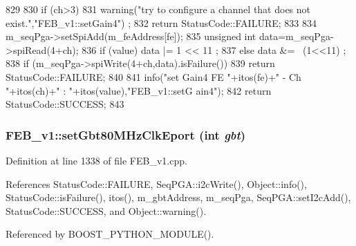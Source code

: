 \begin{DoxyCode}
829                                                        {
830   if (ch>3){
831     warning("try to configure a channel that does not exist.","FEB_v1::setGain4")
      ;
832     return StatusCode::FAILURE;
833   }
834   m_seqPga->setSpiAdd(m_feAddress[fe]);
835   unsigned int data=m_seqPga->spiRead(4+ch);
836   if (value)  data |= 1 << 11 ;
837   else        data &= ~(1<<11) ;
838   if (m_seqPga->spiWrite(4+ch,data).isFailure()){
839     return StatusCode::FAILURE;
840   }
841   info("set Gain4 FE "+itos(fe)+" - Ch "+itos(ch)+" : "+itos(value),"FEB_v1::setG
      ain4");
842   return StatusCode::SUCCESS;
843 }
\end{DoxyCode}
\hypertarget{classFEB__v1_a6efa59ad9f80ae40aad2df0b925b0b14}{
\subsubsection[{setGbt80MHzClkEport}]{ FEB\_\-v1::setGbt80MHzClkEport (int {\em gbt})}}
\label{classFEB__v1_a6efa59ad9f80ae40aad2df0b925b0b14}


Definition at line 1338 of file FEB\_\-v1.cpp.

References StatusCode::FAILURE, SeqPGA::i2cWrite(), Object::info(), StatusCode::isFailure(), itos(), m\_\-gbtAddress, m\_\-seqPga, SeqPGA::setI2cAdd(), StatusCode::SUCCESS, and Object::warning().

Referenced by BOOST\_\-PYTHON\_\-MODULE().



